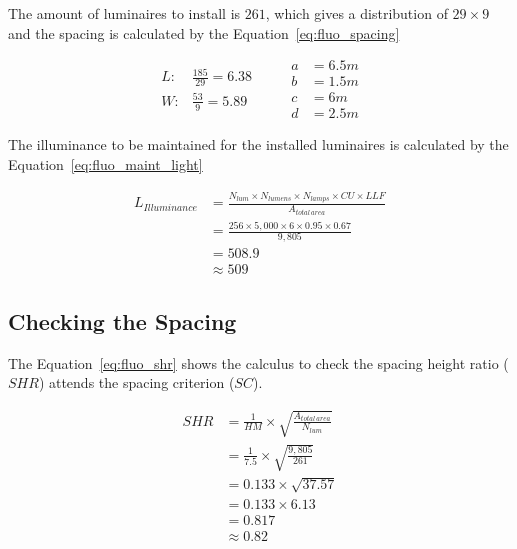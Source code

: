 The amount of luminaires to install is $261$, which gives a distribution of $29 \times 9$ and the spacing is calculated by the Equation~\ref{eq:fluo_spacing}

\begin{equation}
\begin{split}
L: & \frac{185}
          {29} = 6.38\\
W: & \frac{53}
          {9} = 5.89
\end{split}
\qquad
\begin{split}
a & = 6.5 m \\
b & = 1.5 m \\
c & = 6 m \\
d & = 2.5m
\end{split}
\label{eq:fluo_spacing}
\end{equation}

The illuminance to be maintained for the installed luminaires is calculated by the Equation~\ref{eq:fluo_maint_light}

\begin{equation}
\begin{split}
L_{Illuminance} & =
\frac {N_{lum} \times N_{lumens} \times N_{lamps} \times CU \times LLF}
      {A_{total\,area}} \\
 & = \frac{256 \times 5,000 \times 6 \times 0.95 \times 0.67}
          {9,805} \\
 & = 508.9 \\
 & \approx 509
\end{split}
\label{eq:fluo_maint_light}
\end{equation}

\subsection{Checking the Spacing}
The Equation~\ref{eq:fluo_shr} shows the calculus to check the spacing height ratio ($SHR$) attends the spacing criterion ($SC$).

\begin{equation}
\begin{split}
SHR & = \frac {1}{HM} \times \sqrt{\frac{A_{total\,area}}{N_{lum}}} \\
 & = \frac {1}{7.5} \times \sqrt{\frac{9,805}{261}} \\
 & = 0.133 \times \sqrt{37.57} \\
 & = 0.133 \times 6.13 \\
 & = 0.817 \\
 & \approx 0.82
\end{split}
\label{eq:fluo_shr}
\end{equation}

